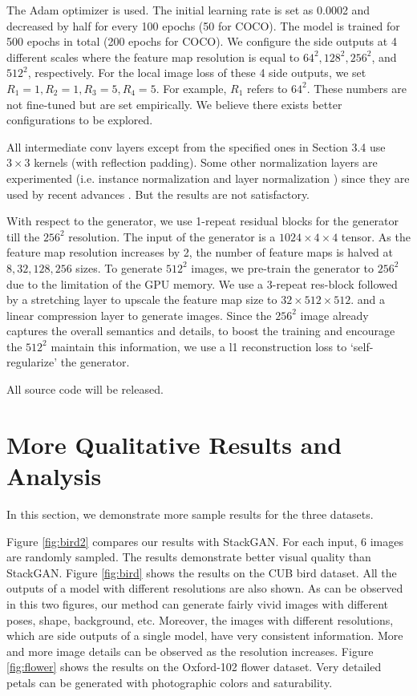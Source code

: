 \documentclass[10pt, letterpaper]{article}
\begin{document}
The Adam optimizer \cite{kingma2014adam} is used.  The initial learning rate is set as 0.0002 and decreased by half for every 100 epochs (50 for COCO). The model is trained for 500 epochs in total (200 epochs for COCO).
We configure the side outputs at 4 different scales where the feature map resolution is equal to $64^2,128^2,256^2$, and $512^2$, respectively.
For the local image loss of these 4 side outputs, we set $R_1=1, R_2=1, R_3=5, R_4=5$. For example, $R_1$ refers to $64^2$. These numbers are not fine-tuned but are set empirically. We believe there exists better configurations to be explored.

All intermediate conv layers except from the specified ones in Section 3.4 use $3{\times}3$ kernels (with reflection padding).
Some other normalization layers are experimented (i.e. instance normalization \cite{ulyanov2016instance} and layer normalization \cite{ba2016layer}) since they are used by recent advances \cite{zhu2017unpaired,chen2017photographic}. But the results are not satisfactory. 

With respect to the generator, we use 1-repeat residual blocks for the generator till the $256^2$ resolution. The input of the generator is a $1024{\times}4{\times}4$ tensor.  As the feature map resolution increases by 2, the number of feature maps is halved at $8, 32, 128, 256$ sizes. 
To generate $512^2$ images, we pre-train the generator to $256^2$ due to the limitation of the GPU memory. We use a $3$-repeat res-block followed by a stretching layer to upscale the feature map size to $32{\times}512{\times}512$. and a linear compression layer to generate images. 
Since the $256^2$ image already captures the overall semantics and details, to boost the training and encourage the $512^2$ maintain this information, we use a l1 reconstruction loss to `self-regularize' the generator. %

All source code will be released. %

\section{More Qualitative Results and Analysis}
In this section, we demonstrate more sample results for the three datasets.

Figure \ref{fig:bird2} compares our results with StackGAN. For each input, 6 images are randomly sampled. The results demonstrate better visual quality than StackGAN.
Figure \ref{fig:bird} shows the results on the CUB bird dataset. All the outputs of a model with different resolutions are also shown. As can be observed in this two figures, our method can generate fairly vivid images with different poses, shape, background, etc. Moreover, the images with different resolutions, which are side outputs of a single model, have very consistent information. More and more image details can be observed as the resolution increases.
Figure \ref{fig:flower} shows the results on the Oxford-102 flower dataset. Very detailed petals can be generated with photographic colors and saturability.
\end{document}
